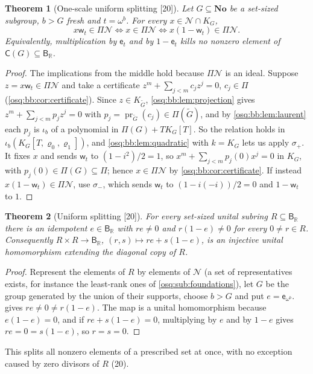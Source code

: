 \documentclass[11pt,letterpaper]{article}
\numberwithin{equation}{section}
\newtheorem{theorem}{Theorem}[section]
\theoremstyle{definition}
\theoremstyle{remark}
\theoremstyle{plain}
\newcommand{\No}{\mathbf{No}}
\newcommand{\R}{\mathbb R}
\newcommand{\NN}{\mathcal N}         %
\newcommand{\src}[1]{\textup{\textsf{[#1]}}}
\begin{document}
\begin{theorem}[One-scale uniform splitting \src{20}]\label{osq:bb:thm:split}
Let $G\subseteq\No$ be a set-sized subgroup, $b>G$ fresh and $t=\omega^b$. For every $x\in\NN\cap K_G$,
\[
 x\mathsf w_t\in\Pi\NN\iff x\in\Pi\NN\iff x(1-\mathsf w_t)\in\Pi\NN .
\]
Equivalently, multiplication by $\mathsf e_t$ and by $1-\mathsf e_t$ kills no nonzero element of $\mathsf C(G)\subseteq\mathsf B_\R$.
\end{theorem}
\begin{proof}
The implications from the middle hold because $\Pi\NN$ is an ideal. Suppose $z=x\mathsf w_t\in\Pi\NN$ and take a certificate
$z^m+\sum_{j<m}c_jz^j=0$, $c_j\in\Pi$ (\cref{osq:bb:cor:certificate}). Since $z\in K_{\widetilde G}$, \cref{osq:bb:lem:projection}
gives $z^m+\sum_{j<m}p_jz^j=0$ with $p_j=\operatorname{pr}_{\widetilde G}(c_j)\in\Pi(\widetilde G)$, and by \cref{osq:bb:lem:laurent} each
$p_j$ is $\iota_b$ of a polynomial in $\Pi(G)+TK_G[T]$. So the relation holds in $\iota_b(K_G[T,\varrho_0,\varrho_1])$, and
\cref{osq:bb:lem:quadratic} with $k=K_G$ lets us apply $\sigma_+$. It fixes $x$ and sends $\mathsf w_t$ to $(1-i^2)/2=1$, so
$x^m+\sum_{j<m}p_j(0)x^j=0$ in $K_G$, with $p_j(0)\in\Pi(G)\subseteq\Pi$; hence $x\in\Pi\NN$ by \cref{osq:bb:cor:certificate}. If
instead $x(1-\mathsf w_t)\in\Pi\NN$, use $\sigma_-$, which sends $\mathsf w_t$ to $(1-i(-i))/2=0$ and $1-\mathsf w_t$ to $1$.
\end{proof}

\begin{theorem}[Uniform splitting \src{20}]\label{osq:bb:thm:uniform}
For every set-sized unital subring $R\subseteq\mathsf B_\R$ there is an idempotent $e\in\mathsf B_\R$ with $re\ne0$ and $r(1-e)\ne0$
for every $0\ne r\in R$. Consequently $R\times R\to\mathsf B_\R$, $(r,s)\mapsto re+s(1-e)$, is an injective unital homomorphism
extending the diagonal copy of $R$.
\end{theorem}
\begin{proof}
Represent the elements of $R$ by elements of $\NN$ (a set of representatives exists, for instance the least-rank ones of
\cref{osq:sub:foundations}), let $G$ be the group generated by the union of their supports, choose $b>G$ and put
$e=\mathsf e_{\omega^b}$.  gives $re\ne0\ne r(1-e)$. The map is a unital homomorphism because $e(1-e)=0$, and
if $re+s(1-e)=0$, multiplying by $e$ and by $1-e$ gives $re=0=s(1-e)$, so $r=s=0$.
\end{proof}

This splits all nonzero elements of a prescribed set at once, with no exception caused by zero divisors of $R$ (20).
\end{document}
